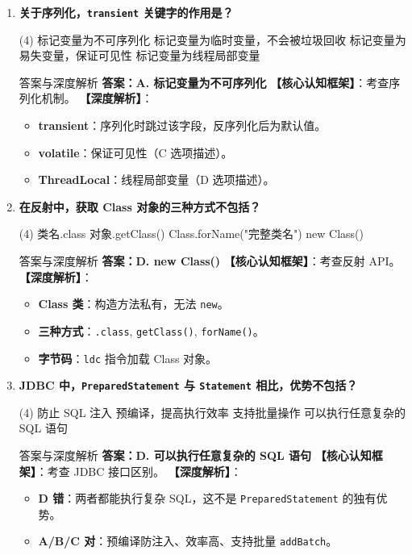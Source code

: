 \documentclass[12pt, a4paper]{ctexart}
\newcommand{\code}[1]{\texttt{#1}}
\begin{document}
\begin{enumerate}[label=\textbf{\arabic*.}, leftmargin=*, itemsep=1.5em]
\item \textbf{关于序列化，\code{transient} 关键字的作用是？}
\begin{tasks}(4)
    \task 标记变量为不可序列化 \task 标记变量为临时变量，不会被垃圾回收
    \task 标记变量为易失变量，保证可见性 \task 标记变量为线程局部变量
\end{tasks}
\begin{bluebox}{答案与深度解析}
\textbf{答案：A. 标记变量为不可序列化}
\textbf{【核心认知框架】}：考查序列化机制。
\textbf{【深度解析】}：
\begin{itemize}[leftmargin=*, nosep]
    \item \textbf{transient}：序列化时跳过该字段，反序列化后为默认值。
    \item \textbf{volatile}：保证可见性（C 选项描述）。
    \item \textbf{ThreadLocal}：线程局部变量（D 选项描述）。
\end{itemize}
\end{bluebox}

\item \textbf{在反射中，获取 Class 对象的三种方式不包括？}
\begin{tasks}(4)
    \task 类名.class \task 对象.getClass() \task Class.forName("完整类名") \task new Class()
\end{tasks}
\begin{bluebox}{答案与深度解析}
\textbf{答案：D. new Class()}
\textbf{【核心认知框架】}：考查反射 API。
\textbf{【深度解析】}：
\begin{itemize}[leftmargin=*, nosep]
    \item \textbf{Class 类}：构造方法私有，无法 \code{new}。
    \item \textbf{三种方式}：\code{.class}, \code{getClass()}, \code{forName()}。
    \item \textbf{字节码}：\code{ldc} 指令加载 Class 对象。
\end{itemize}
\end{bluebox}

\item \textbf{JDBC 中，\code{PreparedStatement} 与 \code{Statement} 相比，优势不包括？}
\begin{tasks}(4)
    \task 防止 SQL 注入 \task 预编译，提高执行效率 \task 支持批量操作 \task 可以执行任意复杂的 SQL 语句
\end{tasks}
\begin{bluebox}{答案与深度解析}
\textbf{答案：D. 可以执行任意复杂的 SQL 语句}
\textbf{【核心认知框架】}：考查 JDBC 接口区别。
\textbf{【深度解析】}：
\begin{itemize}[leftmargin=*, nosep]
    \item \textbf{D 错}：两者都能执行复杂 SQL，这不是 \code{PreparedStatement} 的独有优势。
    \item \textbf{A/B/C 对}：预编译防注入、效率高、支持批量 \code{addBatch}。
\end{itemize}
\end{bluebox}
\end{enumerate}
\end{document}

